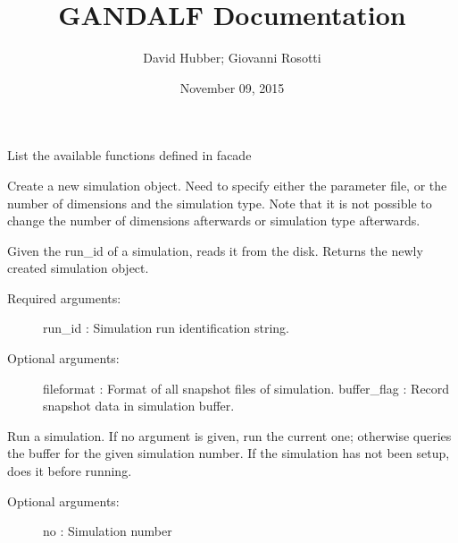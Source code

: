 \documentclass[letterpaper,10pt,english]{sphinxmanual}
\title{GANDALF Documentation}
\date{November 09, 2015}
\author{David Hubber; Giovanni Rosotti}
\begin{document}
\maketitle
\tableofcontents
{}\label{index::doc}\label{index:module-facade}

\begin{fulllineitems}
\label{index:facade.ListFunctions}
List the available functions defined in facade

\end{fulllineitems}


\begin{fulllineitems}
\label{index:facade.newsim}
Create a new simulation object. Need to specify either the parameter
file, or the number of dimensions and the simulation type. Note that it is not
possible to change the number of dimensions afterwards or simulation type
afterwards.

\end{fulllineitems}


\begin{fulllineitems}
\label{index:facade.loadsim}
Given the run\_id of a simulation, reads it from the disk.
Returns the newly created simulation object.
\begin{description}
\item[{Required arguments:}] \leavevmode
run\_id      : Simulation run identification string.

\item[{Optional arguments:}] \leavevmode
fileformat  : Format of all snapshot files of simulation.
buffer\_flag : Record snapshot data in simulation buffer.

\end{description}

\end{fulllineitems}


\begin{fulllineitems}
\label{index:facade.run}
Run a simulation. If no argument is given, run the current one;
otherwise queries the buffer for the given simulation number.
If the simulation has not been setup, does it before running.
\begin{description}
\item[{Optional arguments:}] \leavevmode
no         : Simulation number

\end{description}

\end{fulllineitems}
\end{document}
